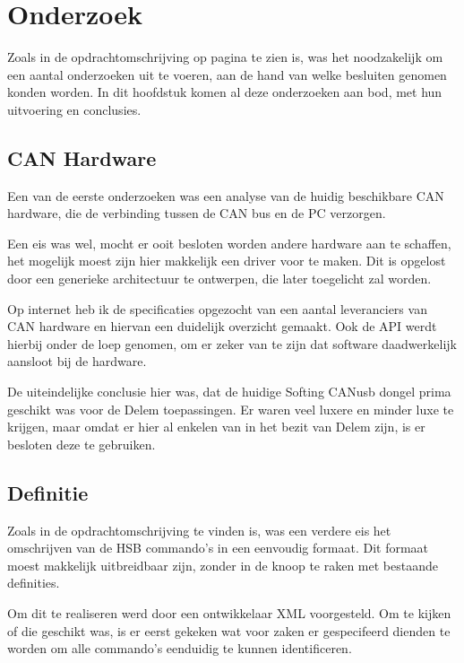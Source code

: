 \chapter{Onderzoek}

Zoals in de opdrachtomschrijving op pagina \pageref{opdracht} te zien is, was het noodzakelijk om een aantal onderzoeken uit te voeren, aan de hand van welke besluiten genomen konden worden. In dit hoofdstuk komen al deze onderzoeken aan bod, met hun uitvoering en conclusies.

\section{CAN Hardware}

Een van de eerste onderzoeken was een analyse van de huidig beschikbare CAN hardware, die de verbinding tussen de CAN bus en de PC verzorgen.

Een eis was wel, mocht er ooit besloten worden andere hardware aan te schaffen, het mogelijk moest zijn hier makkelijk een driver voor te maken. Dit is opgelost door een generieke architectuur te ontwerpen, die later toegelicht zal worden.

Op internet heb ik de specificaties opgezocht van een aantal leveranciers van CAN hardware en hiervan een duidelijk overzicht gemaakt. Ook de API werdt hierbij onder de loep genomen, om er zeker van te zijn dat software daadwerkelijk aansloot bij de hardware.

De uiteindelijke conclusie hier was, dat de huidige Softing CANusb dongel prima geschikt was voor de Delem toepassingen. Er waren veel luxere en minder luxe te krijgen, maar omdat er hier al enkelen van in het bezit van Delem zijn, is er besloten deze te gebruiken.

\section{Definitie}
\label{definitie}

Zoals in de opdrachtomschrijving te vinden is, was een verdere eis het omschrijven van de HSB commando's in een eenvoudig formaat. Dit formaat moest makkelijk uitbreidbaar zijn, zonder in de knoop te raken met bestaande definities.

Om dit te realiseren werd door een ontwikkelaar XML voorgesteld. Om te kijken of die geschikt was, is er eerst gekeken wat voor zaken er gespecifeerd dienden te worden om alle commando's eenduidig te kunnen identificeren.

